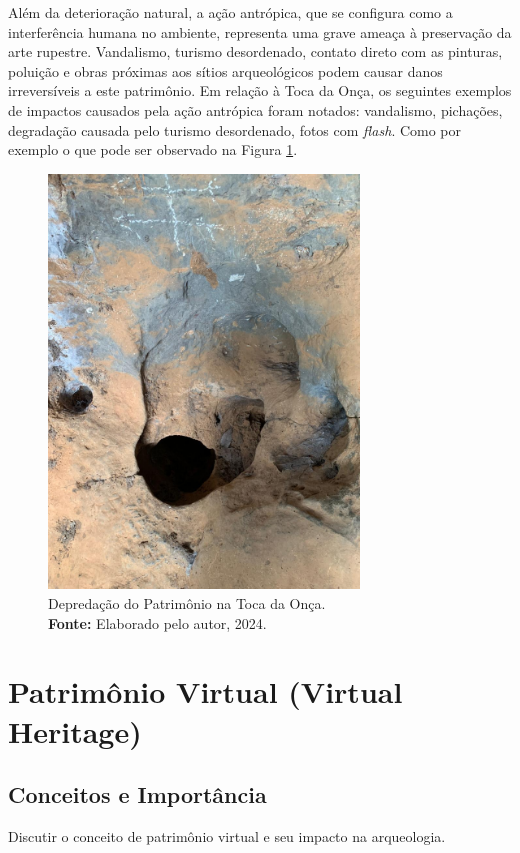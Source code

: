 Além da deterioração natural, a ação antrópica, que se configura como a interferência humana no ambiente, representa uma grave ameaça à preservação da arte rupestre. Vandalismo, turismo desordenado, contato direto com as pinturas, poluição e obras próximas aos sítios arqueológicos podem causar danos irreversíveis a este patrimônio.
Em relação à Toca da Onça, os seguintes exemplos de impactos causados pela ação antrópica foram notados: vandalismo, pichações, degradação causada pelo turismo desordenado, fotos com \textit{flash}. Como por exemplo o que pode ser observado na Figura \ref{fig:degradacao_toca_onca}.

\begin{figure}[H]
    \centering
    \includegraphics[height=11cm, keepaspectratio]{img/jogo da velha.jpeg}
    \caption{Depredação do Patrimônio na Toca da Onça. \\
        \textbf{Fonte:} Elaborado pelo autor, 2024.}
    \label{fig:degradacao_toca_onca}
\end{figure}


\section{Patrimônio Virtual (Virtual Heritage)}
\subsection{Conceitos e Importância}
Discutir o conceito de patrimônio virtual e seu impacto na arqueologia.

